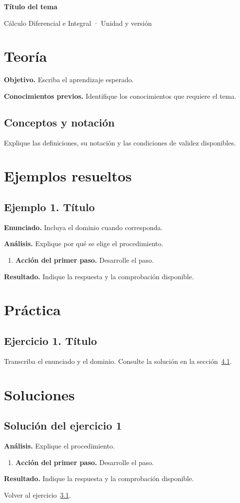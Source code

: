 \documentclass[11pt,letterpaper]{article}
\begin{document}
{\LARGE\bfseries Título del tema\par}
Cálculo Diferencial e Integral · Unidad y versión\par
\section{Teoría}
\textbf{Objetivo.} Escriba el aprendizaje esperado.

\textbf{Conocimientos previos.} Identifique los conocimientos que requiere el tema.

\subsection{Conceptos y notación}
Explique las definiciones, su notación y las condiciones de validez disponibles.

\section{Ejemplos resueltos}
\subsection{Ejemplo 1. Título}
\textbf{Enunciado.} Incluya el dominio cuando corresponda.

\textbf{Análisis.} Explique por qué se elige el procedimiento.
\begin{enumerate}
\item \textbf{Acción del primer paso.} Desarrolle el paso.
\end{enumerate}
\textbf{Resultado.} Indique la respuesta y la comprobación disponible.

\section{Práctica}
\subsection{Ejercicio 1. Título}
\label{ej:p1}
Transcriba el enunciado y el dominio. Consulte la solución en la sección~\ref{sol:p1}.

\section{Soluciones}
\subsection{Solución del ejercicio 1}
\label{sol:p1}
\textbf{Análisis.} Explique el procedimiento.
\begin{enumerate}
\item \textbf{Acción del primer paso.} Desarrolle el paso.
\end{enumerate}
\textbf{Resultado.} Indique la respuesta y la comprobación disponible.

Volver al ejercicio~\ref{ej:p1}.
\end{document}
